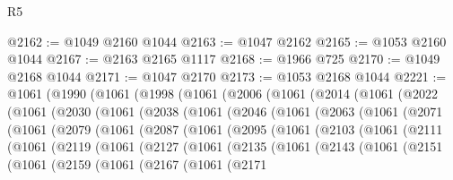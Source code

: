 \begin{lexlean}{R5}
\begin{coremodule}
@2162 := @1049 @2160 @1044
@2163 := @1047 @2162
@2165 := @1053 @2160 @1044
@2167 := @2163 @2165 @1117
@2168 := @1966 @725
@2170 := @1049 @2168 @1044
@2171 := @1047 @2170
@2173 := @1053 @2168 @1044
@2221 := @1061
    (@1990
      (@1061
        (@1998
          (@1061
            (@2006
              (@1061
                (@2014
                  (@1061
                    (@2022
                      (@1061
                        (@2030
                          (@1061
                            (@2038
                              (@1061
                                (@2046
                                  (@1061
                                    (@2063
                                      (@1061
                                        (@2071
                                          (@1061
                                            (@2079
                                              (@1061
                                                (@2087
                                                  (@1061
                                                    (@2095
                                                      (@1061
                                                        (@2103
                                                          (@1061
                                                            (@2111
                                                              (@1061
                                                                (@2119
                                                                  (@1061
                                                                    (@2127
                                                                      (@1061
                                                                        (@2135
                                                                          (@1061
                                                                            (@2143
                                                                              (@1061
                                                                                (@2151
                                                                                  (@1061
                                                                                    (@2159
                                                                                      (@1061
                                                                                        (@2167
                                                                                          (@1061
                                                                                            (@2171

\end{coremodule}
\end{lexlean}
